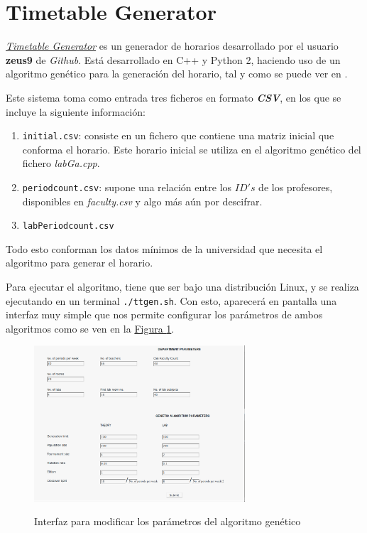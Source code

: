 \section{Timetable Generator}

\href{https://github.com/zeus9/timetable_generator}{\textit{Timetable Generator}} es un generador de horarios desarrollado por el usuario \textbf{zeus9} de \textit{Github}. Está desarrollado en C++ y Python 2, haciendo uso de un algoritmo genético para la generación del horario, tal y como se puede ver en \cite{timetableGenerator}.

Este sistema toma como entrada tres ficheros en formato \textbf{\textit{CSV}}, en los que se incluye la siguiente información:

\begin{enumerate}[$\bullet$]
    \item \texttt{initial.csv}: consiste en un fichero que contiene una matriz inicial que conforma el horario. Este horario inicial se utiliza en el algoritmo genético del fichero \textit{labGa.cpp}.
    \item \texttt{periodcount.csv}: supone una relación entre los $ID's$ de los profesores, disponibles en \textit{faculty.csv} y algo más aún por descifrar.
    \item \texttt{labPeriodcount.csv}
\end{enumerate}

Todo esto conforman los datos mínimos de la universidad que necesita el algoritmo para generar el horario. 

Para ejecutar el algoritmo, tiene que ser bajo una distribución Linux, y se realiza ejecutando en un terminal \texttt{./ttgen.sh}. Con esto, aparecerá en pantalla una interfaz muy simple que nos permite configurar los parámetros de ambos algoritmos como se ven en la \hyperref[ttgen1]{Figura \ref{ttgen1}}.

\begin{figure}[H]
    \centering
    \includegraphics[width=0.7\textwidth]{ttgen1}
    \label{ttgen1}
    \caption{Interfaz para modificar los parámetros del algoritmo genético}
\end{figure}

